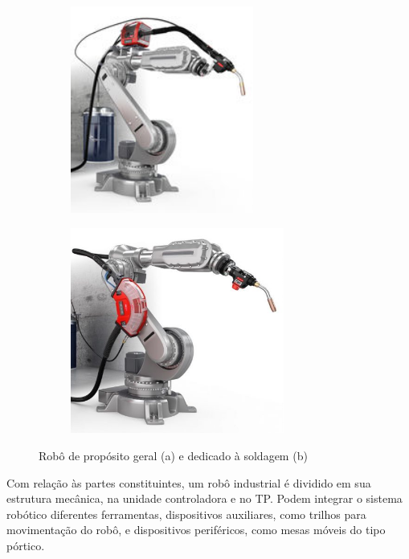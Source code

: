         \begin{figure}[h]
            \centering
            \begin{subfigure}[b]{0.4\textwidth}
                \centering
                \includegraphics[width=6cm]{imagens/Fotos/Robo_de_proposito_geral.png}
                \caption{}
                \label{fig:robo_geral}
            \end{subfigure}
            \hfill
            \begin{subfigure}[b]{0.49\textwidth}
                \centering
                \includegraphics[width=7cm]{imagens/Fotos/Robo_dedicado.png}
                \caption{}
                \label{fig:robo_dedicado}
            \end{subfigure}
            \caption{Robô de propósito geral (a) e dedicado à soldagem (b)}
            \label{fig:tipos}
        \end{figure}
        
        Com relação às partes constituintes, um robô industrial é dividido em sua estrutura mecânica, na unidade controladora e no \ac{TP}. Podem integrar o sistema robótico diferentes ferramentas, dispositivos auxiliares, como trilhos para movimentação do robô, e dispositivos periféricos, como mesas móveis do tipo pórtico.  
        
